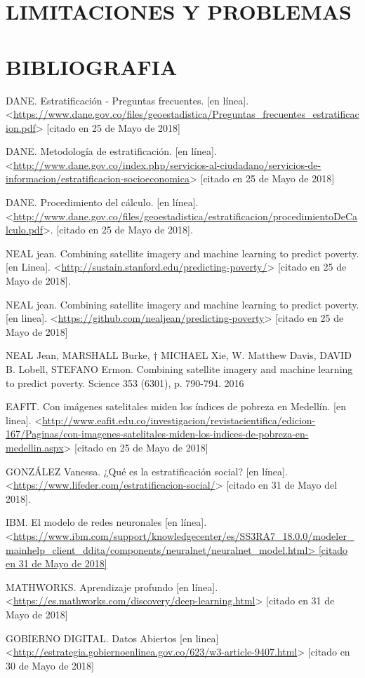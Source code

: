     
    
    
    \newpage\chapter{LIMITACIONES Y PROBLEMAS} 
    
    
    
    


    
\newpage\chapter*{BIBLIOGRAFIA}

DANE. Estratificación - Preguntas frecuentes. [en línea]. <\url{https://www.dane.gov.co/files/geoestadistica/Preguntas_frecuentes_estratificacion.pdf}> [citado en 25 de Mayo de 2018]
    
DANE. Metodología de estratificación. [en línea].
 <\url{http://www.dane.gov.co/index.php/servicios-al-ciudadano/servicios-de-informacion/estratificacion-socioeconomica}> [citado en 25 de Mayo de 2018]

DANE. Procedimiento del cálculo. [en línea].
 <\url{http://www.dane.gov.co/files/geoestadistica/estratificacion/procedimientoDeCalculo.pdf}>.
 [citado en 25 de Mayo de 2018].
 
NEAL jean. Combining satellite imagery and machine learning to predict poverty. [en Linea]. <\url{http://sustain.stanford.edu/predicting-poverty/}> [citado en 25 de Mayo de 2018].

NEAL jean. Combining satellite imagery and machine learning to predict poverty. [en linea]. <\url{https://github.com/nealjean/predicting-poverty}> [citado en 25 de Mayo de 2018]

NEAL Jean, MARSHALL Burke, † MICHAEL Xie, W. Matthew Davis, DAVID B. Lobell, STEFANO Ermon. Combining satellite imagery and machine learning to predict poverty. Science 353 (6301), p. 790-794. 2016

EAFIT. Con imágenes satelitales miden los índices de pobreza en Medellín. [en linea]. <\url{http://www.eafit.edu.co/investigacion/revistacientifica/edicion-167/Paginas/con-imagenes-satelitales-miden-los-indices-de-pobreza-en-medellin.aspx}> [citado en 25 de Mayo de 2018]

GONZÁLEZ Vanessa. ¿Qué es la estratificación social? [en línea]. <\url{https://www.lifeder.com/estratificacion-social/}> [citado en 31 de Mayo del 2018].

IBM. El modelo de redes neuronales [en línea]. <\url{https://www.ibm.com/support/knowledgecenter/es/SS3RA7_18.0.0/modeler_mainhelp_client_ddita/components/neuralnet/neuralnet_model.html> [citado en 31 de Mayo de 2018]}

MATHWORKS. Aprendizaje profundo [en línea]. <\url{https://es.mathworks.com/discovery/deep-learning.html}> [citado en 31 de Mayo de 2018]

GOBIERNO DIGITAL. Datos Abiertos [en linea] <\url{http://estrategia.gobiernoenlinea.gov.co/623/w3-article-9407.html}> [citado en 30 de Mayo de 2018]

